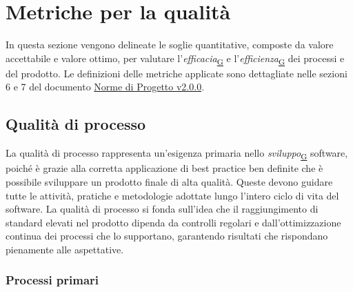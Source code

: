 \documentclass[a4paper,12pt]{article}
\begin{document}
\section{Metriche per la qualità}{
    In questa sezione vengono delineate le soglie quantitative, composte da valore accettabile e valore ottimo, per valutare l'\textit{efficacia}\textsubscript{\href{https://atlasteam9.github.io/Atlas/glossario.html\#Efficacia}{G}} e l'\textit{efficienza}\textsubscript{\href{https://atlasteam9.github.io/Atlas/glossario.html\#Efficienza}{G}} dei processi e del prodotto. Le definizioni delle metriche applicate sono dettagliate nelle sezioni 6 e 7 del documento \href{https://atlasteam9.github.io/Atlas/docs/PB/documenti/interni/Norme%20di%20Progetto.pdf}{Norme di Progetto v2.0.0}.
    
    \subsection{Qualità di processo}{
    La qualità di processo rappresenta un'esigenza primaria nello \textit{sviluppo}\textsubscript{\href{https://atlasteam9.github.io/Atlas/glossario.html\#Sviluppo}{G}} software, poiché è grazie alla corretta applicazione di best practice ben definite che è possibile sviluppare un prodotto finale di alta qualità. Queste devono guidare tutte le attività, pratiche e metodologie adottate lungo l'intero ciclo di vita del software. La qualità di processo si fonda sull'idea che il raggiungimento di standard elevati nel prodotto dipenda da controlli regolari e dall'ottimizzazione continua dei processi che lo supportano, garantendo risultati che rispondano pienamente alle aspettative.
    
        \subsubsection{Processi primari}{

}}}
\end{document}
